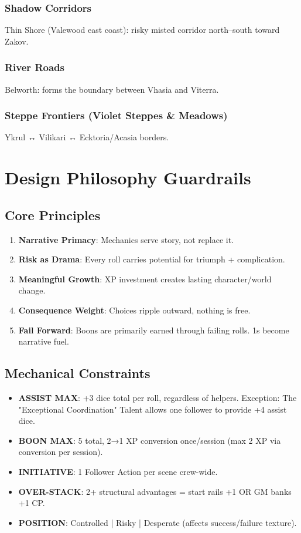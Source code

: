 \documentclass[11pt]{article}
\begin{document}
\subsubsection{Shadow Corridors}
Thin Shore (Valewood east coast): risky misted corridor north–south toward Zakov.

\subsubsection{River Roads}
Belworth: forms the boundary between Vhasia and Viterra.

\subsubsection{Steppe Frontiers (Violet Steppes \& Meadows)}
Ykrul ↔ Vilikari ↔ Ecktoria/Acasia borders.

\section{Design Philosophy Guardrails}

\subsection{Core Principles}
\begin{enumerate}
    \item \textbf{Narrative Primacy}: Mechanics serve story, not replace it.
    \item \textbf{Risk as Drama}: Every roll carries potential for triumph + complication.
    \item \textbf{Meaningful Growth}: XP investment creates lasting character/world change.
    \item \textbf{Consequence Weight}: Choices ripple outward, nothing is free.
    \item \textbf{Fail Forward}: Boons are primarily earned through failing rolls. 1s become narrative fuel.
\end{enumerate}

\subsection{Mechanical Constraints}
\begin{itemize}
    \item \textbf{ASSIST MAX}: +3 dice total per roll, regardless of helpers. Exception: The "Exceptional Coordination" Talent allows one follower to provide +4 assist dice.
    \item \textbf{BOON MAX}: 5 total, 2→1 XP conversion once/session (max 2 XP via conversion per session).
    \item \textbf{INITIATIVE}: 1 Follower Action per scene crew-wide.
    \item \textbf{OVER-STACK}: 2+ structural advantages = start rails +1 OR GM banks +1 CP.
    \item \textbf{POSITION}: Controlled | Risky | Desperate (affects success/failure texture).
\end{itemize}
\end{document}
